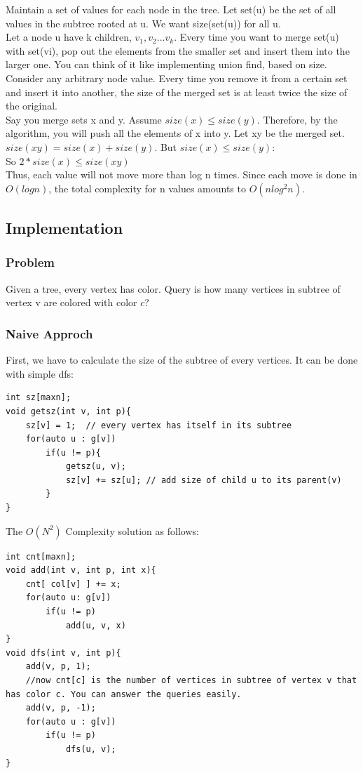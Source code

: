 \documentclass[12pt]{article}
\begin{document}
Maintain a set of values for each node in the tree. Let set(u) be the set of all values in the subtree rooted at u. We want size(set(u)) for all u.\\
Let a node u have k children, $v_1,v_2...v_k$. Every time you want to merge set(u) with set(vi), pop out the elements from the smaller set and insert them into the larger one. You can think of it like implementing union find, based on size.\\
Consider any arbitrary node value. Every time you remove it from a certain set and insert it into another, the size of the merged set is at least twice the size of the original.\\
Say you merge sets x and y. Assume $size(x)\leq size(y)$. Therefore, by the algorithm, you will push all the elements of x into y. Let xy be the merged set. $size(xy) = size(x)+size(y)$. But  $size(x)\leq size(y)$:\\
So $2*size(x) \leq size(xy) $\\
Thus, each value will not move more than log n times. Since each move is done in $O(logn)$, the total complexity for n values amounts to $O(nlog^2 n)$. \cite{11} \\

\subsection{Implementation}
\subsubsection*{Problem}
Given a tree, every vertex has color. Query is how many vertices in subtree of vertex v are colored with color $c$?
\subsubsection*{Naive Approch}
First, we have to calculate the size of the subtree of every vertices. It can be done with simple dfs:
\begin{verbatim}
int sz[maxn];
void getsz(int v, int p){
    sz[v] = 1;  // every vertex has itself in its subtree
    for(auto u : g[v])
        if(u != p){
            getsz(u, v);
            sz[v] += sz[u]; // add size of child u to its parent(v)
        }
}
\end{verbatim}
The $O(N^2)$ Complexity solution as follows:
\begin{verbatim}
int cnt[maxn];
void add(int v, int p, int x){
    cnt[ col[v] ] += x;
    for(auto u: g[v])
        if(u != p)
            add(u, v, x)
}
void dfs(int v, int p){
    add(v, p, 1);
    //now cnt[c] is the number of vertices in subtree of vertex v that has color c. You can answer the queries easily.
    add(v, p, -1);
    for(auto u : g[v])
        if(u != p)
            dfs(u, v);
}
\end{verbatim}
\end{document}
